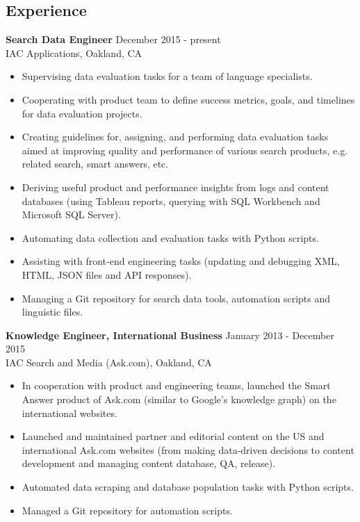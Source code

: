 \documentclass[10pt,line,letterpaper]{res}
\begin{document}
\address{2024 Vine St Apt 2D, Berkeley, CA}
\address{sofya.mulenok@gmail.com or (415)-359-3454}

\begin{resume}
\pagestyle{empty}
\section{Experience}
    {\bf Search Data Engineer} \hfill December 2015 - present \\
    IAC Applications, Oakland, CA
    \begin{itemize} \itemsep -2pt
    \item Supervising data evaluation tasks for a team of language specialists.
    \item Cooperating with product team to define success metrics, goals, and timelines for data evaluation projects.
    \item Creating guidelines for, assigning, and performing data evaluation tasks aimed at improving quality and performance of various search products, e.g. related search, smart answers, etc.
    \item Deriving useful product and performance insights from logs and content databases (using Tableau reports, querying with SQL Workbench and Microsoft SQL Server).
    \item Automating data collection and evaluation tasks with Python scripts.
    \item Assisting with front-end engineering tasks (updating and debugging XML, HTML, JSON files and API responses).
    \item Managing a Git repository for search data tools, automation scripts and linguistic files.
    \end{itemize}
    
    {\bf Knowledge Engineer, International Business} \hfill January 2013 - December 2015 \\
    IAC Search and Media (Ask.com), Oakland, CA
    \begin{itemize} \itemsep -2pt
    \item In cooperation with product and engineering teams, launched the Smart Answer product of Ask.com (similar to Google's knowledge graph) on the international websites.
    \item Launched and maintained partner and editorial content on the US and international Ask.com websites (from making data-driven decisions to content development and managing content database, QA, release).
    \item Automated data scraping and database population tasks with Python scripts.
    \item Managed a Git repository for automation scripts.
    \end{itemize}


\end{resume}
\end{document}
